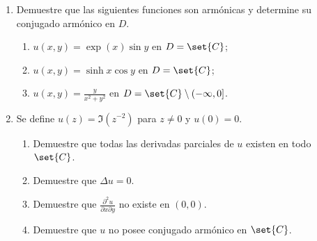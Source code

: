 \documentclass{homework}
\begin{document}
\begin{prob}
    \begin{enumerate}[label=(\alph*)]
        \item Demuestre que las siguientes funciones son armónicas y determine su conjugado armónico en \(D\).
        \begin{enumerate}[label=(\roman*)]
            \item \(u(x,y)=\exp(x)\sin y\) en \(D=\set{C}\);
            \item \(u(x,y)=\sinh x\cos y\) en \(D=\set{C}\);
            \item \(u(x,y)=\frac{y}{x^2+y^2}\) en \(D=\set{C}\setminus(-\infty,0]\).
        \end{enumerate}
        \item Se define \(u(z)=\Im(z^{-2})\) para \(z\neq0\) y \(u(0)=0\).
        \begin{enumerate}[label=(\roman*)]
            \item Demuestre que todas las derivadas parciales de \(u\) existen en todo \(\set{C}\).
            \item Demuestre que \(\Delta u=0\).
            \item Demuestre que \(\frac{\partial^2u}{\partial x\partial y}\) no existe en \((0,0)\).
            \item Demuestre que \(u\) no posee conjugado armónico en \(\set{C}\).
        \end{enumerate}
    \end{enumerate}
\end{prob}
\end{document}
